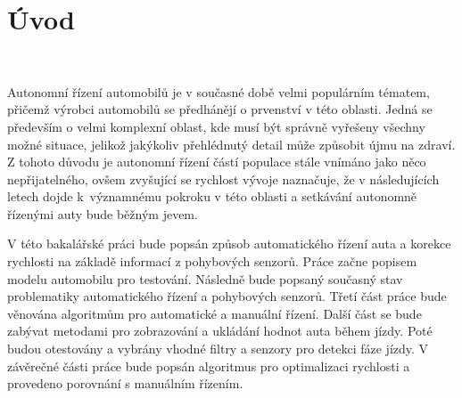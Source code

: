 \chapter*{Úvod}
\label{sec:Introduction}
\

Autonomní řízení automobilů je v současné době velmi populárním tématem, přičemž
výrobci automobilů se předhánějí o prvenství v této oblasti. Jedná se především o
velmi komplexní oblast, kde musí být správně vyřešeny všechny možné situace, jelikož
jakýkoliv přehlédnutý detail může způsobit újmu na zdraví. Z tohoto důvodu je
autonomní řízení částí populace stále vnímáno jako něco  nepřijatelného, ovšem
zvyšující se rychlost vývoje naznačuje, že v následujících letech dojde k~významnému
pokroku v této oblasti a setkávání autonomně řízenými auty bude běžným jevem.

V této bakalářské práci bude popsán způsob automatického řízení auta a korekce rychlosti na základě informací z pohybových senzorů. Práce začne popisem modelu automobilu pro testování. Následně bude popsaný současný stav problematiky automatického řízení a pohybových senzorů. Třetí část práce bude věnována algoritmům pro automatické a manuální řízení. Další část se bude zabývat metodami pro zobrazování a ukládání hodnot auta během jízdy. Poté budou otestovány a vybrány vhodné filtry a senzory pro detekci fáze jízdy. V závěrečné části práce bude popsán algoritmus pro optimalizaci rychlosti a provedeno porovnání s manuálním řízením.

\endinput

